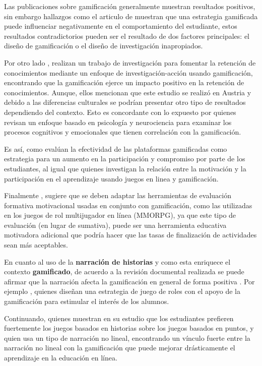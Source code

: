 Las publicaciones sobre gamificación generalmente muestran resultados positivos, sin embargo hallazgos
como el articulo de  muestran que una estrategia gamificada puede influenciar negativamente
en el comportamiento del estudiante, estos resultados contradictorios pueden ser el resultado de dos factores 
principales: el diseño de gamificación o el diseño de investigación inapropiados.

Por otro lado , realizan un trabajo de investigación para fomentar la retención de 
conocimientos mediante un enfoque de investigación-acción usando gamificación, encontrando que la gamificación 
ejerce un impacto positivo en la retención de conocimientos. Aunque, ellos mencionan que
este estudio se realizó en Austria y debido a las diferencias culturales se podrían presentar otro tipo de
resultados dependiendo del contexto. Esto es concordante con lo expuesto por  quienes 
revisan un enfoque basado en psicología y neurociencia para examinar los procesos cognitivos y emocionales que
tienen correlación con la gamificación.

Es así, como  evalúan la efectividad de las plataformas gamificadas como estrategia 
para un aumento en la participación y compromiso por parte de los estudiantes, al igual que 
 quienes investigan la relación entre la motivación y la participación en el 
aprendizaje usando juegos en linea y gamificación.


Finalmente , sugiere que se deben adaptar las herramientas de evaluación formativa 
motivacional usadas en conjunto con gamificación, como las utilizadas en los juegos de rol multijugador en 
línea (MMORPG), ya que este tipo de evaluación (en lugar de sumativa), puede ser una herramienta educativa 
motivadora adicional que podría hacer que las tasas de finalización de actividades sean más aceptables.


En cuanto al uso de la \textbf{narración de historias} y como esta enriquece el contexto \textbf{gamificado}, 
de acuerdo a la revisión documental realizada se puede afirmar que la narración afecta la gamificación en 
general de forma positiva \cite{articleGiakalaras}. Por ejemplo , quienes diseñan una estrategia 
de juego de roles con el apoyo de la gamificación para estimular el interés de los alumnos.

Continuando,  quienes muestran en su estudio que los estudiantes prefieren 
fuertemente los juegos basados en historias sobre los juegos basados en puntos, y  quien usa
un tipo de narración no lineal, encontrando un vínculo fuerte entre la narración no lineal con la gamificación
que puede mejorar drásticamente el aprendizaje en la educación en línea.

